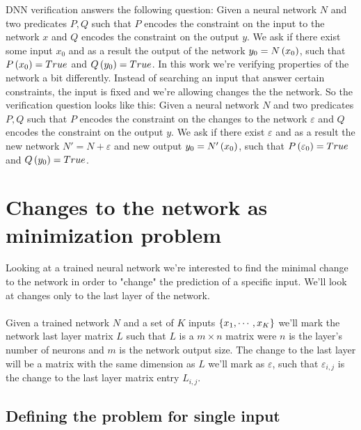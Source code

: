 \documentclass[a4paper]{easychair}
\begin{document}
DNN verification answers the following question: Given a neural network $N$ and two predicates $P,Q$ such that $P$ encodes the constraint on the input to the network $x$ and $Q$ encodes the constraint on the output $y$. We ask if there exist some input $x_0$ and as a result the output of the network $y_0=N\left(x_0\right)$, such that $P\left(x_0\right)=True$ and $Q\left(y_0\right)=True$.
In this work we're verifying properties of the network a bit differently. Instead of searching an input that answer certain constraints, the input is fixed and we're allowing changes the the network. So the verification question looks like this: Given a neural network $N$ and two predicates $P,Q$ such that $P$ encodes the constraint on the changes to the network $\varepsilon$ and $Q$ encodes the constraint on the output $y$. We ask if there exist $\varepsilon$ and as a result the new network $N'=N+\varepsilon$ and new output $y_0=N'\left(x_0\right)$, such that $P\left(\varepsilon_0\right)=True$ and $Q\left(y_0\right)=True$.  
\cite{KaBaDiJuKo17Reluplex,KaHuIbJuLaLiShThWuZeDiKoBa19Marabou}

\section{Changes to the network as minimization problem}
\label{sec:minimizationProblem}

Looking at a trained neural network we're interested to find the minimal change to the network in order to "change" the prediction of a specific input. We'll look at changes only to the last layer of the network.
\\\\
Given a trained network $N$ and a set of $K$ inputs $\left\lbrace x_1,\cdots,x_K\right\rbrace$ we'll mark the network last layer matrix $L$ such that $L$ is a $m\times n$ matrix were $n$ is the layer's number of neurons and $m$ is the network output size. The change to the last layer will be a matrix with the same dimension as $L$ we'll mark as $\varepsilon$, such that $\varepsilon_{i,j}$ is the change to the last layer matrix entry $L_{i,j}$. 

\subsection{Defining the problem for single input}
\label{sec:defineProblem1}
\end{document}
